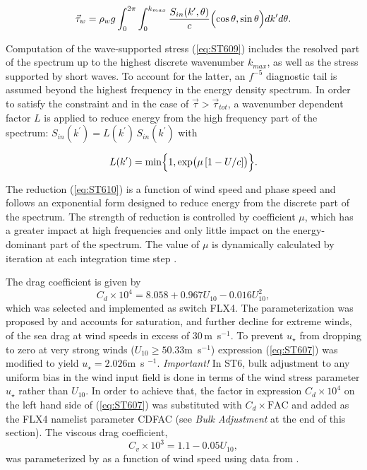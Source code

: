 \begin{equation}\label{eq:ST609}
   \vec{\tau}_w = \rho_w g \int_{0}^{2\pi} \int_{0}^{k_{max}}
   \frac{S_{in}(k^\prime,\theta)}{c} \Bigl (\cos\theta,\sin\theta \Bigr )
   dk^\prime d\theta  .
\end{equation}

\noindent
Computation of the wave-supported stress (\ref{eq:ST609}) includes the
resolved part of the spectrum up to the highest discrete wavenumber $k_{max}$,
as well as the stress supported by short waves. To account for the latter,
an $f^{-5}$ diagnostic tail is assumed beyond the highest frequency in the
energy density spectrum. In order to satisfy the constraint and in the case
of $\vec{\tau} > \vec{\tau}_{tot}$, a wavenumber dependent factor $L$ is
applied to reduce energy from the high frequency part of the spectrum:
$S_{in}(k^\prime)=L(k^\prime)\,S_{in}(k^\prime)$ with

\begin{equation}\label{eq:ST610}
L(k^\prime) = \min \Bigl \{ 1, \exp \bigl ( \mu\,[1- U/c] \bigr ) \Bigr
\}  .
\end{equation}

\noindent
The reduction (\ref{eq:ST610}) is a function of wind speed and phase speed and
follows an exponential form designed to reduce energy from the discrete part
of the spectrum. The strength of reduction is controlled by coefficient $\mu$,
which has a greater impact at high frequencies and only little impact on the
energy-dominant part of the spectrum. The value of $\mu$ is dynamically
calculated by iteration at each integration time step \citep{art:Tea10}.

The drag coefficient is given by
\begin{equation}\label{eq:ST607}
C_d \times 10^4 = 8.058 + 0.967 U_{10} - 0.016 U_{10}^2 ,
\end{equation}
which was selected and
implemented as switch {\code FLX4}. The parameterization was proposed by
\citet{art:Hwa11} and accounts for saturation, and further decline
for extreme winds, of the sea drag at wind speeds in excess of 30\,m~s$^{-1}$.
To prevent $u_\star$ from dropping to zero at very strong winds
($U_{10}\ge50.33$m~s$^{-1}$) expression (\ref{eq:ST607}) was modified to yield
$u_\star=2.026$m~s $^{-1}$. {\it Important!} In {\code ST6}, bulk adjustment to any
uniform bias in the wind input field is done in terms of the wind stress
parameter $u_\star$ rather than $U_{10}$. In order to achieve that, the
factor in expression $C_d \times 10^4$ on the left hand side of
(\ref{eq:ST607}) was substituted with $C_d \times \mathrm{FAC}$ and added
as the {\F FLX4} namelist parameter {\code CDFAC} (see {\it Bulk Adjustment}
at the end of this section).
The viscous drag coefficient,
\begin{equation}\label{eq:ST608}
  C_v \times 10^3 = 1.1 - 0.05 U_{10} ,
\end{equation}
was parameterized by \citet{art:Tea10} as a function of wind speed using
data from \citet{art:BP98}.

